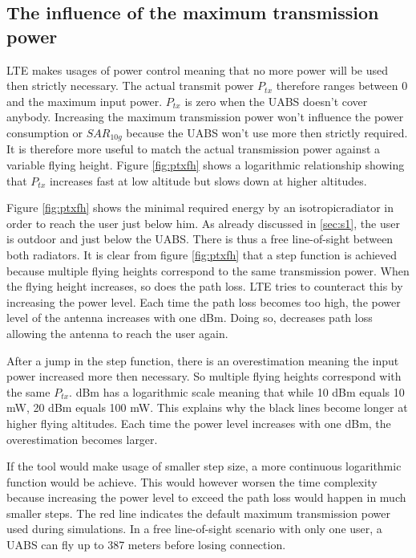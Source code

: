 \subsection{The influence of the maximum transmission power}
\gls{LTE} makes usages of power control meaning that no more power will be used then strictly necessary. The actual 
transmit power $P_{tx}$ therefore ranges between 0 and the maximum input power. $P_{tx}$ is zero when the \gls{UABS} doesn't cover anybody.
Increasing the maximum transmission power won't influence the power consumption or $SAR_{10g}$ because the \gls{UABS} won't use more
then strictly required. It is therefore more useful to match the actual transmission power against a variable flying height. Figure \ref{fig:ptxfh}
shows a logarithmic  relationship showing that $P_{tx}$ increases fast at low altitude but slows down at higher altitudes. 

Figure \ref{fig:ptxfh} shows the minimal required energy by an \gls{isotropicradiator} in order to reach the user just below him.
As already discussed in \ref{sec:s1}, the user is outdoor and just below the \gls{UABS}. There is thus a free line-of-sight between both
radiators. It is clear  from figure \ref{fig:ptxfh} that a step function is achieved because multiple flying heights correspond to the same transmission power.
When the flying height increases, so does the path loss. \gls{LTE} tries to counteract this by increasing the power level. Each time 
the path loss becomes too high, the power level of the antenna increases with one dBm. Doing so, decreases path loss allowing the antenna to reach
the user again. 

After a jump in the step function, there is an overestimation meaning the input power increased more then necessary. So multiple flying heights correspond with the same $P_{tx}$.
dBm has a logarithmic scale meaning that while 10 dBm equals 10 mW, 20 dBm equals 100 mW. This explains why the black lines become longer at higher flying altitudes.
Each time the power level increases with one dBm, the overestimation becomes larger.

If the tool would make usage of smaller step size, a more continuous 
logarithmic function would be achieve. This would however worsen the time complexity because increasing the power level to exceed the path loss
would happen in much smaller steps. The red line indicates the default maximum transmission power used during simulations. 
In a free line-of-sight scenario with only one user, a \gls{UABS} can fly up to 387 meters before losing connection.

